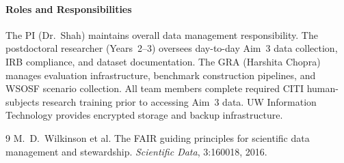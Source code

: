 \paragraph{Roles and Responsibilities}

The PI (Dr.\ Shah) maintains overall data management responsibility. The postdoctoral researcher (Years~2--3) oversees day-to-day Aim~3 data collection, IRB compliance, and dataset documentation. The GRA (Harshita Chopra) manages evaluation infrastructure, benchmark construction pipelines, and WSOSF scenario collection. All team members complete required CITI human-subjects research training prior to accessing Aim~3 data. UW Information Technology provides encrypted storage and backup infrastructure.

\vspace*{-8pt}
\begingroup
\renewcommand{\bibsection}{}

\begin{thebibliography}{9}
M.~D.~Wilkinson et al.
\newblock The {FAIR} guiding principles for scientific data management and stewardship.
\newblock \textit{Scientific Data}, 3:160018, 2016.
\end{thebibliography}
\endgroup
